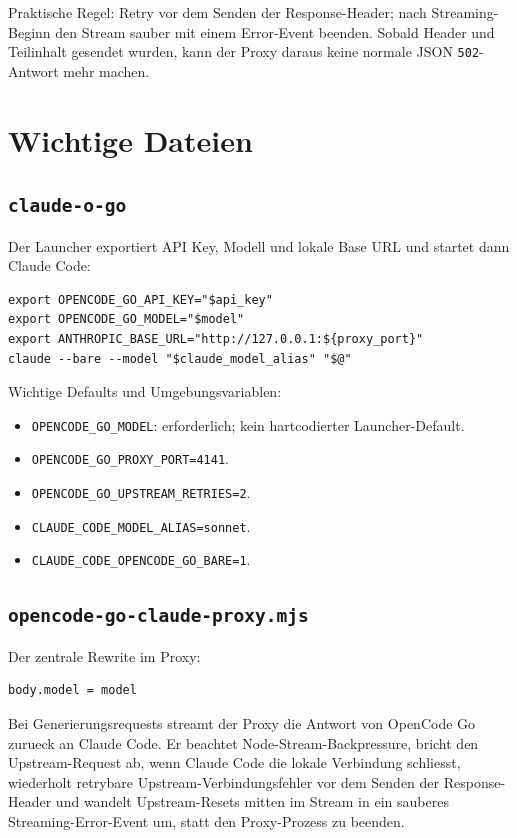 \documentclass[11pt,a4paper]{article}
\newcommand{\code}[1]{\texttt{#1}}
\begin{document}
Praktische Regel: Retry vor dem Senden der Response-Header; nach
Streaming-Beginn den Stream sauber mit einem Error-Event beenden. Sobald Header
und Teilinhalt gesendet wurden, kann der Proxy daraus keine normale JSON
\code{502}-Antwort mehr machen.

\section{Wichtige Dateien}

\subsection{\code{claude-o-go}}

Der Launcher exportiert API Key, Modell und lokale Base URL und startet dann
Claude Code:

\begin{verbatim}
export OPENCODE_GO_API_KEY="$api_key"
export OPENCODE_GO_MODEL="$model"
export ANTHROPIC_BASE_URL="http://127.0.0.1:${proxy_port}"
claude --bare --model "$claude_model_alias" "$@"
\end{verbatim}

Wichtige Defaults und Umgebungsvariablen:

\begin{itemize}
  \item \code{OPENCODE\_GO\_MODEL}: erforderlich; kein hartcodierter Launcher-Default.
  \item \code{OPENCODE\_GO\_PROXY\_PORT=4141}.
  \item \code{OPENCODE\_GO\_UPSTREAM\_RETRIES=2}.
  \item \code{CLAUDE\_CODE\_MODEL\_ALIAS=sonnet}.
  \item \code{CLAUDE\_CODE\_OPENCODE\_GO\_BARE=1}.
\end{itemize}

\subsection{\code{opencode-go-claude-proxy.mjs}}

Der zentrale Rewrite im Proxy:

\begin{verbatim}
body.model = model
\end{verbatim}

Bei Generierungsrequests streamt der Proxy die Antwort von OpenCode Go zurueck
an Claude Code. Er beachtet Node-Stream-Backpressure, bricht den
Upstream-Request ab, wenn Claude Code die lokale Verbindung schliesst,
wiederholt retrybare Upstream-Verbindungsfehler vor dem Senden der
Response-Header und wandelt Upstream-Resets mitten im Stream in ein sauberes
Streaming-Error-Event um, statt den Proxy-Prozess zu beenden.
\end{document}
